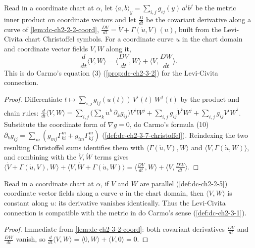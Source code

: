 \begin{lemma}
  \label{lem:dc-ch2-3-2-coord}
  \leanok
  Read in a coordinate chart at $\alpha$, let $\langle a,b\rangle_y=\sum_{i,j}g_{ij}(y)\,a^i b^j$
  be the metric inner product on coordinate vectors and let $\frac{D}{dt}$ be the covariant
  derivative along a curve of \cref{lem:dc-ch2-2-2-coord}, $\frac{DV}{dt}=\dot V+\Gamma(\dot u,V)(u)$,
  built from the Levi-Civita chart Christoffel symbols. For a coordinate curve $u$ in the chart
  domain and coordinate vector fields $V,W$ along it,
  $$
  \frac{d}{dt}\langle V,W\rangle=\Big\langle\frac{DV}{dt},W\Big\rangle+\Big\langle V,\frac{DW}{dt}\Big\rangle.
  $$
  This is do Carmo's equation (3) (\cref{prop:dc-ch2-3-2}) for the Levi-Civita connection.
\end{lemma}
\begin{proof}
  \leanok
  Differentiate $t\mapsto\sum_{i,j}g_{ij}(u(t))\,V^i(t)\,W^j(t)$ by the product and chain rules:
  $\frac{d}{dt}\langle V,W\rangle=\sum_{i,j}\big(\sum_k\dot u^k\,\partial_k g_{ij}\big)V^iW^j
  +\sum_{i,j}g_{ij}\dot V^iW^j+\sum_{i,j}g_{ij}V^i\dot W^j$. Substitute the coordinate form of
  $\nabla g=0$, do Carmo's formula (10) $\partial_k g_{ij}=\sum_m(g_{mj}\Gamma^m_{ki}+g_{im}\Gamma^m_{kj})$
  (\cref{def:dc-ch2-3-7-christoffel}). Reindexing the two resulting Christoffel sums identifies them
  with $\langle\Gamma(\dot u,V),W\rangle$ and $\langle V,\Gamma(\dot u,W)\rangle$, and combining with
  the $\dot V,\dot W$ terms gives $\langle\dot V+\Gamma(\dot u,V),W\rangle+\langle V,\dot W+\Gamma(\dot u,W)\rangle
  =\langle\frac{DV}{dt},W\rangle+\langle V,\frac{DW}{dt}\rangle$.
\end{proof}

\begin{lemma}
  \label{lem:dc-ch2-3-1-coord}
  \leanok
  Read in a coordinate chart at $\alpha$, if $V$ and $W$ are parallel (\cref{def:dc-ch2-2-5})
  coordinate vector fields along a curve $u$ in the chart domain, then $\langle V,W\rangle$ is
  constant along $u$: its derivative vanishes identically. Thus the Levi-Civita connection is
  compatible with the metric in do Carmo's sense (\cref{def:dc-ch2-3-1}).
\end{lemma}
\begin{proof}
  \leanok
  Immediate from \cref{lem:dc-ch2-3-2-coord}: both covariant derivatives $\frac{DV}{dt}$ and
  $\frac{DW}{dt}$ vanish, so $\frac{d}{dt}\langle V,W\rangle
  =\langle 0,W\rangle+\langle V,0\rangle=0$.
\end{proof}

